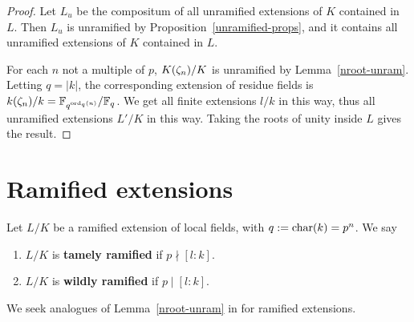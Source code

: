 \begin{proof}
Let $L_u$ be the compositum of all unramified extensions of $K$ contained in $L$. Then $L_u$ is unramified by Proposition~\ref{unramified-props}, and it contains all unramified extensions of $K$ contained in $L$.

For each $n$ not a multiple of $p$, $K(\zeta_n)/K$ is unramified by Lemma~\ref{nroot-unram}. Letting $q=|k|$, the corresponding extension of residue fields is $k(\zeta_n)/k=\mathbb{F}_{q^{\operatorname{ord}_q(n)}}/\mathbb{F}_q$. We get all finite extensions $l/k$ in this way, thus all unramified extensions $L'/K$ in this way. Taking the roots of unity inside $L$ gives the result.
\end{proof}
\section{Ramified extensions}
\begin{df}
Let $L/K$ be a ramified extension of local fields, with $q:=\operatorname{char}(k)=p^n$. We say
\begin{enumerate}
\item
$L/K$ is \textbf{tamely ramified} if $p\nmid [l:k]$.
\item
$L/K$ is \textbf{wildly ramified} if $p\mid[l:k]$.
\end{enumerate}
\end{df}
We seek analogues of Lemma~\ref{nroot-unram} in for ramified extensions.

